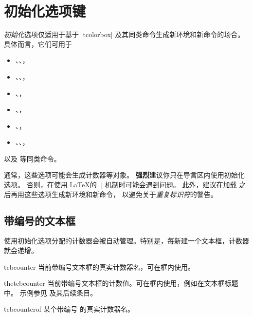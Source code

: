 \clearpage
\section{初始化选项键}\label{sec:initkeys}%
%
\emph{初始化}选项仅适用于基于 |tcolorbox| 及其同类命令生成新环境和新命令的场合。
具体而言，它们可用于
\begin{itemize}
\item{}、、，
\item{}、、，
\item{}、，
\item{}、，
\item{}、，
\item{}、、，
\end{itemize}
以及  等同类命令。

\bigskip
\begin{marker}
通常，这些选项可能会生成计数器等对象。
\textbf{强烈}建议你只在导言区内使用初始化选项。
否则，在使用 \LaTeX 的 || 机制时可能会遇到问题。
此外，建议在加载  之后再用这些选项生成新环境和新命令，
以避免关于\emph{重复标识符}的警告。
\end{marker}


\subsection{带编号的文本框}\label{sec:numberedboxes}
使用初始化选项分配的计数器会被自动管理。特别是，每新建一个文本框，计数器就会递增。


\begin{docCommand}{tcbcounter}{}
  当前带编号文本框的真实计数器名，可在框内使用。
\end{docCommand}

\begin{docCommand}{thetcbcounter}{}
  当前带编号文本框的计数值。可在框内使用，例如在文本框标题中。
  示例参见  及其后续条目。
\end{docCommand}

\begin{docCommand}[doc new=2025-07-21]{tcbcounterof}{}
  某个带编号  的真实计数器名。
\end{docCommand}

